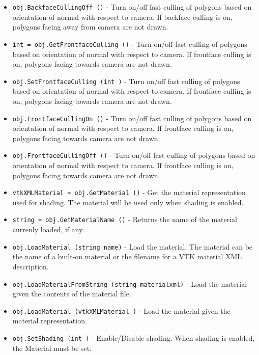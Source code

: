 \begin{itemize}
\item  \verb|obj.BackfaceCullingOff ()| -  Turn on/off fast culling of polygons based on orientation of normal
 with respect to camera. If backface culling is on, polygons facing
 away from camera are not drawn.

\item  \verb|int = obj.GetFrontfaceCulling ()| -  Turn on/off fast culling of polygons based on orientation of normal
 with respect to camera. If frontface culling is on, polygons facing
 towards camera are not drawn.

\item  \verb|obj.SetFrontfaceCulling (int )| -  Turn on/off fast culling of polygons based on orientation of normal
 with respect to camera. If frontface culling is on, polygons facing
 towards camera are not drawn.

\item  \verb|obj.FrontfaceCullingOn ()| -  Turn on/off fast culling of polygons based on orientation of normal
 with respect to camera. If frontface culling is on, polygons facing
 towards camera are not drawn.

\item  \verb|obj.FrontfaceCullingOff ()| -  Turn on/off fast culling of polygons based on orientation of normal
 with respect to camera. If frontface culling is on, polygons facing
 towards camera are not drawn.

\item  \verb|vtkXMLMaterial = obj.GetMaterial ()| -  Get the material representation used for shading. The material will be used
 only when shading is enabled.

\item  \verb|string = obj.GetMaterialName ()| -  Returns the name of the material currenly loaded, if any.

\item  \verb|obj.LoadMaterial (string name)| -  Load the material. The material can be the name of a
 built-on material or the filename for a VTK material XML description.

\item  \verb|obj.LoadMaterialFromString (string materialxml)| -  Load the material given the contents of the material file.

\item  \verb|obj.LoadMaterial (vtkXMLMaterial )| -  Load the material given the material representation.

\item  \verb|obj.SetShading (int )| -  Enable/Disable shading. When shading is enabled, the
 Material must be set.


\end{itemize}
